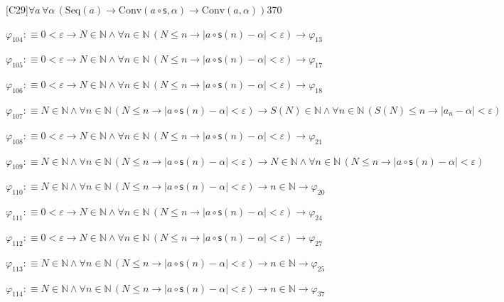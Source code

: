 \begin{fullproof}{[C29]}{$\forall a\,\forall \alpha\,(\mathrm{Seq}(a) \to \mathrm{Conv}(a \circ \mathsf{s},\alpha) \to \mathrm{Conv}(a,\alpha))$}{370}
\begin{abbrevlist}
\item $\varphi_{104} :\equiv 0 < \varepsilon \to N \in \mathbb{N} \land \forall n \in \mathbb{N}\,(N \leq n \to \lvert a \circ \mathsf{s}(n) - \alpha \rvert < \varepsilon) \to \varphi_{13}$
\item $\varphi_{105} :\equiv 0 < \varepsilon \to N \in \mathbb{N} \land \forall n \in \mathbb{N}\,(N \leq n \to \lvert a \circ \mathsf{s}(n) - \alpha \rvert < \varepsilon) \to \varphi_{17}$
\item $\varphi_{106} :\equiv 0 < \varepsilon \to N \in \mathbb{N} \land \forall n \in \mathbb{N}\,(N \leq n \to \lvert a \circ \mathsf{s}(n) - \alpha \rvert < \varepsilon) \to \varphi_{18}$
\item $\varphi_{107} :\equiv N \in \mathbb{N} \land \forall n \in \mathbb{N}\,(N \leq n \to \lvert a \circ \mathsf{s}(n) - \alpha \rvert < \varepsilon) \to S(N) \in \mathbb{N} \land \forall n \in \mathbb{N}\,(S(N) \leq n \to \lvert a_{n} - \alpha \rvert < \varepsilon)$
\item $\varphi_{108} :\equiv 0 < \varepsilon \to N \in \mathbb{N} \land \forall n \in \mathbb{N}\,(N \leq n \to \lvert a \circ \mathsf{s}(n) - \alpha \rvert < \varepsilon) \to \varphi_{21}$
\item $\varphi_{109} :\equiv N \in \mathbb{N} \land \forall n \in \mathbb{N}\,(N \leq n \to \lvert a \circ \mathsf{s}(n) - \alpha \rvert < \varepsilon) \to N \in \mathbb{N} \land \forall n \in \mathbb{N}\,(N \leq n \to \lvert a \circ \mathsf{s}(n) - \alpha \rvert < \varepsilon)$
\item $\varphi_{110} :\equiv N \in \mathbb{N} \land \forall n \in \mathbb{N}\,(N \leq n \to \lvert a \circ \mathsf{s}(n) - \alpha \rvert < \varepsilon) \to n \in \mathbb{N} \to \varphi_{20}$
\item $\varphi_{111} :\equiv 0 < \varepsilon \to N \in \mathbb{N} \land \forall n \in \mathbb{N}\,(N \leq n \to \lvert a \circ \mathsf{s}(n) - \alpha \rvert < \varepsilon) \to \varphi_{24}$
\item $\varphi_{112} :\equiv 0 < \varepsilon \to N \in \mathbb{N} \land \forall n \in \mathbb{N}\,(N \leq n \to \lvert a \circ \mathsf{s}(n) - \alpha \rvert < \varepsilon) \to \varphi_{27}$
\item $\varphi_{113} :\equiv N \in \mathbb{N} \land \forall n \in \mathbb{N}\,(N \leq n \to \lvert a \circ \mathsf{s}(n) - \alpha \rvert < \varepsilon) \to n \in \mathbb{N} \to \varphi_{25}$
\item $\varphi_{114} :\equiv N \in \mathbb{N} \land \forall n \in \mathbb{N}\,(N \leq n \to \lvert a \circ \mathsf{s}(n) - \alpha \rvert < \varepsilon) \to n \in \mathbb{N} \to \varphi_{37}$

\end{abbrevlist}
\end{fullproof}

